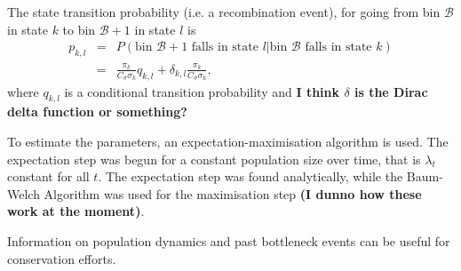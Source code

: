 \documentclass[12pt]{article}
\newcommand{\B}{\mathcal B}
\begin{document}
The state transition probability (i.e. a recombination event), for going from bin $\B$ in state $k$ to bin $\B+1$ in state $l$ is
\begin{eqnarray}
  p_{k,l}&=&P(\text{bin $\B+1$ falls in state $l$}|\text{bin $\B$ falls in state $k$}) \nonumber \\
  &=& \frac{\pi_k}{C_\sigma\sigma_k}q_{k,l}+\delta_{k,l}\frac{\pi_k}{C_\sigma\sigma_k},
\end{eqnarray}
where $q_{k,l}$ is a conditional transition probability and \textbf{I think $\delta$ is the Dirac delta function or something?}

To estimate the parameters, an expectation-maximisation algorithm is used. The expectation step was begun for a constant population size over time, that is $\lambda_t$ constant for all $t$. The expectation step was found analytically, while the Baum-Welch Algorithm was used for the maximisation step \textbf{(I dunno how these work at the moment)}.

Information on population dynamics and past bottleneck events can be useful for conservation efforts.

{}\label{sec:bib}

\end{document}
